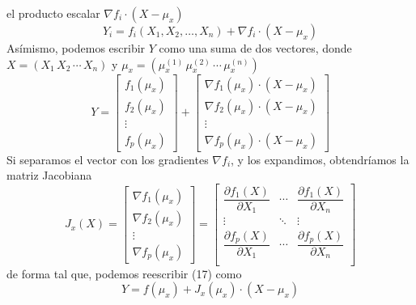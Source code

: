 \documentclass[a4paper, 10pt]{article}
\begin{document}
el producto escalar $\nabla f_i \cdot (X-\mu_x)$
\begin{equation}
    Y_i = f_i(X_1,X_2,\dots,X_n) + \nabla f_i \cdot (X-\mu_x)
\end{equation}
Asímismo, podemos escribir $Y$ como una suma de dos vectores, donde $X=\left(X_1\, X_2\, \cdots\, X_n\right)$ y
$\mu_x = \left(\mu_x^{(1)}\,\mu_x^{(2)}\,\cdots\, \mu_x^{(n)}\right)$
\begin{equation}
    Y = \begin{bmatrix}
        f_1(\mu_x) \\
        f_2(\mu_x) \\
        \vdots     \\
        f_p(\mu_x)
    \end{bmatrix} +
    \begin{bmatrix}
        \nabla f_1\left(\mu_x\right) \cdot (X-\mu_x) \\
        \nabla f_2\left(\mu_x\right) \cdot (X-\mu_x) \\
        \vdots                                       \\
        \nabla f_p\left(\mu_x\right) \cdot (X-\mu_x)
    \end{bmatrix}
\end{equation}
Si separamos el vector con los gradientes $\nabla f_i$, y los expandimos, obtendríamos la matriz Jacobiana
\begin{equation}
    J_x(X) = \begin{bmatrix}
        \nabla f_1\left(\mu_x\right) \\
        \nabla f_2\left(\mu_x\right) \\
        \vdots                       \\
        \nabla f_p\left(\mu_x\right)
    \end{bmatrix} = \begin{bmatrix}
        \dfrac{\partial f_1(X)}{\partial X_1} & \cdots & \dfrac{\partial f_1(X)}{\partial X_n} \\
        \vdots                                & \ddots & \vdots                                \\
        \dfrac{\partial f_p(X)}{\partial X_1} & \cdots & \dfrac{\partial f_p(X)}{\partial X_n} \\
    \end{bmatrix}
\end{equation}
de forma tal que, podemos reescribir (17) como
\begin{equation}
    Y = f(\mu_x) + J_x(\mu_x)\cdot (X-\mu_x)
\end{equation}
\end{document}

